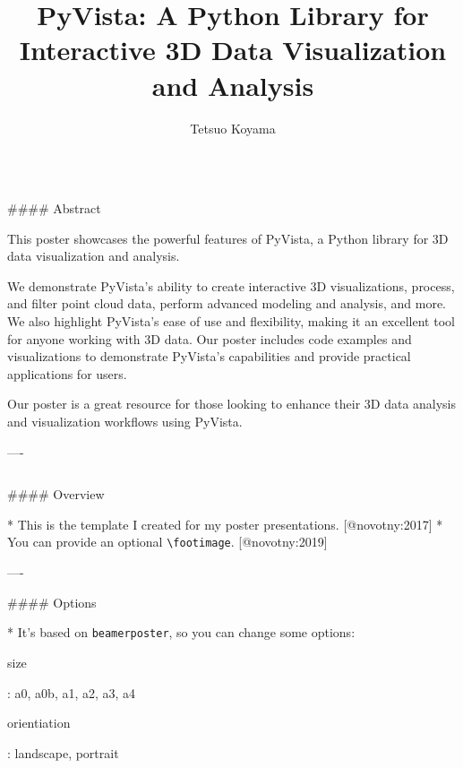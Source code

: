 \documentclass{beamer}
\author[tkoyama@gmail.com]{Tetsuo Koyama}
\title{PyVista: A Python Library for Interactive 3D Data Visualization and Analysis}
\institute{PyVista community}
\begin{document}
\begin{frame}[fragile]\centering

\begin{columns}
\begin{column}{1.0\textwidth}

\begin{markdown}

#### Abstract

This poster showcases the powerful features of PyVista, a Python library for 3D data visualization and analysis.

We demonstrate PyVista's ability to create interactive 3D visualizations, process, and filter point cloud data, perform advanced modeling and analysis, and more.
We also highlight PyVista's ease of use and flexibility, making it an excellent tool for anyone working with 3D data.
Our poster includes code examples and visualizations to demonstrate PyVista's capabilities and provide practical applications for users.

Our poster is a great resource for those looking to enhance their 3D data analysis and visualization workflows using PyVista.

----
\end{markdown}
\end{column}

\end{columns}

\bigskip
{\hrulefill}
\bigskip

\begin{columns}[T]

\begin{column}{.46\textwidth}

\begin{markdown}

#### Overview

* This is the template I created for my poster presentations. [@novotny:2017]
* You can provide an optional \texttt{\textbackslash footimage}. [@novotny:2019]

----


#### Options

* It's based on \texttt{beamerposter}, so you can change some options:

    size
    
    :   a0, a0b, a1, a2, a3, a4

    orientiation
    
    :   landscape, portrait
    

\end{markdown}
\end{column}
\end{columns}
\end{frame}
\end{document}
